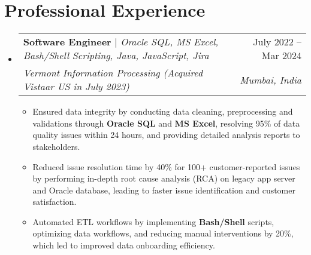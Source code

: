 \documentclass[letterpaper,11pt]{article}
\makeatletter
\newcommand{\resumeItem}[1]{
  \item\small{
    {#1 \vspace{-2pt}}
  }
}
\newcommand{\resumeExperienceSubheading}[5]{
  \vspace{-2pt}\item
    \begin{tabular*}{0.97\textwidth}[t]{l@{\extracolsep{\fill}}r}
      \textbf{#1} \emph{\small#2} & #3 \\
      \textit{\small#4} & \textit{\small #5} \\
    \end{tabular*}\vspace{-7pt}
}
\newcommand{\resumeSubSubheading}[2]{
    \item
    \begin{tabular*}{0.97\textwidth}{l@{\extracolsep{\fill}}r}
      \textit{\small#1} & \textit{\small #2} \\
    \end{tabular*}\vspace{-7pt}
}
\newcommand{\resumeSubHeadingListStart}{\begin{itemize}[leftmargin=0.15in, label={}]}
\newcommand{\resumeSubHeadingListEnd}{\end{itemize}}
\newcommand{\resumeItemListStart}{\begin{itemize}}
\newcommand{\resumeItemListEnd}{\end{itemize}\vspace{-5pt}}
\makeatother
\begin{document}
\section{Professional Experience}
  \resumeSubHeadingListStart

    \resumeExperienceSubheading
      {Software Engineer}{$|$ Oracle SQL, MS Excel, Bash/Shell Scripting, Java, JavaScript, Jira}{July 2022 -- Mar 2024}
      {Vermont Information Processing (Acquired Vistaar US in July 2023)}{Mumbai, India}
      
      \resumeItemListStart
        \resumeItem{Ensured data integrity by conducting data cleaning, preprocessing and validations through \textbf{Oracle SQL} and \textbf{MS Excel}, resolving 95\% of data quality issues within 24 hours, and providing detailed analysis reports to stakeholders.}\resumeItem{Reduced issue resolution time by 40\% for 100+ customer-reported issues by performing in-depth root cause analysis (RCA) on legacy app server and Oracle database, leading to faster issue identification and customer satisfaction.}
        \resumeItem{Automated ETL workflows by implementing \textbf{Bash/Shell} scripts, optimizing data workflows, and reducing manual interventions by 20\%, which led to improved data onboarding efficiency.}
      \resumeItemListEnd
      

  \resumeSubHeadingListEnd


\end{document}
